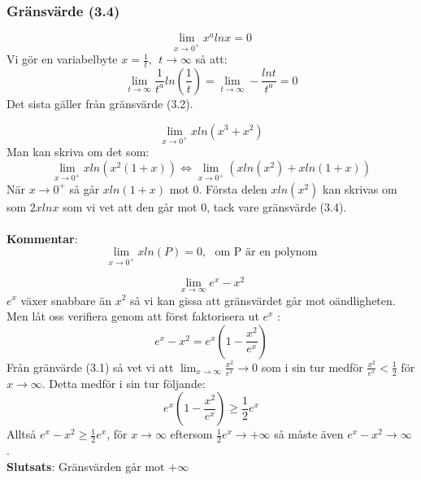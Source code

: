 \documentclass{report}
\begin{document}
\subsubsection{Gränsvärde (3.4)}
\begin{equation*}
\lim_{x \to 0^+} x^a lnx = 0
\end{equation*}
Vi gör en variabelbyte $ x = \frac{1}{t},\:\: t \to \infty $ så att:
\begin{equation*}
	\lim_{t \to \infty} \frac{1}{t^a} ln( \frac{1}{t} ) = \lim_{t \to \infty} - \frac{lnt}{t^a} = 0 
\end{equation*}
Det sista gäller från gränsvärde (3.2).

{
\begin{equation*}
\lim_{x \to 0^+} xln(x^3+x^2)
\end{equation*}
\sol Man kan skriva om det som:
\begin{equation*}
\lim_{x \to 0^+} xln(x^2(1+x)) \iff \lim_{x \to 0^+} ( xln(x^2) + xln(1+x) ) 
\end{equation*}
När $ x \to 0^+ $ så går $ xln(1+x) $ mot $ 0 $. Första delen $ xln(x^2) $ kan skrivas om som $ 2xlnx $ som vi vet att den går mot $ 0 $, tack vare gränsvärde (3.4).\\\\

\noindent
\textbf{Kommentar}:
\begin{equation*}
\lim_{x \to 0^+} xln(P) = 0,\:\:\: \text{om P är en polynom} 
\end{equation*}
}

{
\begin{equation*}
\lim_{x \to \infty} e^x-x^2
\end{equation*}
\sol $ e^x $ växer snabbare än $ x^2 $ så vi kan gissa att gränsvärdet går mot oändligheten. Men låt oss verifiera genom att först faktorisera ut $ e^x $ :
\begin{equation*}
e^x-x^2 = e^x(1 - \frac{x^2}{e^x} ) 
\end{equation*}
Från gränvärde (3.1) så vet vi att $ \lim_{x \to \infty} \frac{x^2}{e^x} \to 0 $ som i sin tur medför $ \frac{x^2}{e^x} < \frac{1}{2}  $ för $ x \to \infty $. Detta medför i sin tur följande:
\begin{equation*}
	e^x(1- \frac{x^2}{e^x} ) \ge  \frac{1}{2} e^x
\end{equation*}
Alltså $ e^x - x^2 \ge \frac{1}{2} e^x $, för $ x \to \infty$ eftersom $ \frac{1}{2} e^x \to + \infty $ så måste även $ e^x-x^2 \to \infty $ .\\
\textbf{Slutsats}: Gränsvärden går mot $ + \infty $ 
}
\end{document}
